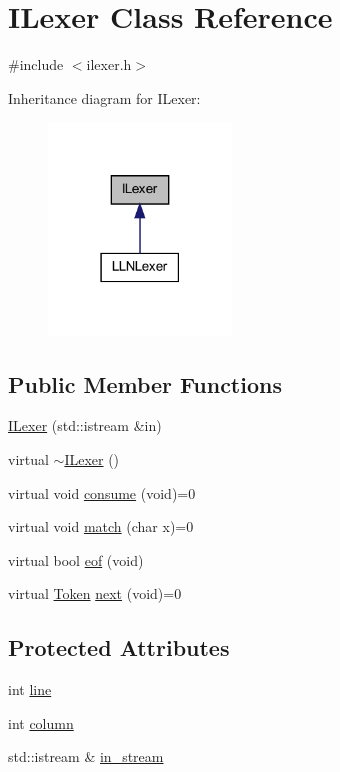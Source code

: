 \hypertarget{class_i_lexer}{
\section{ILexer Class Reference}
\label{class_i_lexer}
}


{\ttfamily \#include $<$ilexer.h$>$}



Inheritance diagram for ILexer:\nopagebreak
\begin{figure}[H]
\begin{center}
\leavevmode
\includegraphics[width=138pt]{class_i_lexer__inherit__graph}
\end{center}
\end{figure}
\subsection*{Public Member Functions}
\begin{DoxyCompactItemize}
\item 
\hyperlink{class_i_lexer_a204cc87b6147aa741d8fde4825843761}{ILexer} (std::istream \&in)
\item 
virtual \hyperlink{class_i_lexer_a1018ca7c4ec102150fe2f6acfe38929d}{$\sim$ILexer} ()
\item 
virtual void \hyperlink{class_i_lexer_ae1009b9b2a1e023e1a7d2fd75806607f}{consume} (void)=0
\item 
virtual void \hyperlink{class_i_lexer_a556fdc7b13486f03cb7c3d7d4612666c}{match} (char x)=0
\item 
virtual bool \hyperlink{class_i_lexer_a0366072c45083ee20123f2552a95b6e0}{eof} (void)
\item 
virtual \hyperlink{class_token}{Token} \hyperlink{class_i_lexer_a6f5098fda43f68b01d2e7a2a7158c50d}{next} (void)=0
\end{DoxyCompactItemize}
\subsection*{Protected Attributes}
\begin{DoxyCompactItemize}
\item 
int \hyperlink{class_i_lexer_a5d766f4f4dcc976553ab17a5753ef8ff}{line}
\item 
int \hyperlink{class_i_lexer_a05ce2bfa3595f992618d2a328b66bdfb}{column}
\item 
std::istream \& \hyperlink{class_i_lexer_a02d418cc6fdcbfbf6cad7bf914cce77f}{in\_\-stream}
\end{DoxyCompactItemize}


